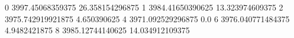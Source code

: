 0 3997.45068359375 26.358154296875
1 3984.41650390625 13.323974609375
2 3975.742919921875 4.650390625
4 3971.092529296875 0.0
6 3976.040771484375 4.9482421875
8 3985.12744140625 14.034912109375
